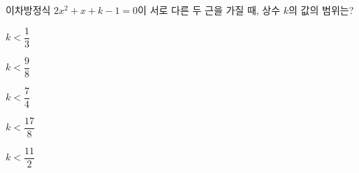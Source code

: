 이차방정식 $2x^2+x+k-1=0$이 서로 다른 두 근을 가질 때, 상수 $k$의 값의 범위는?
\begin{choices32}{\rule[-3ex]{0pt}{8ex}$k<\dfrac{1}{3}$}{\rule[-3ex]{0pt}{8ex}$k<\dfrac{9}{8}$}{\rule[-3ex]{0pt}{8ex}$k<\dfrac{7}{4}$}{\rule[-3ex]{0pt}{8ex}$k<\dfrac{17}{8}$}{\rule[-3ex]{0pt}{8ex}$k<\dfrac{11}{2}$}\end{choices32}
